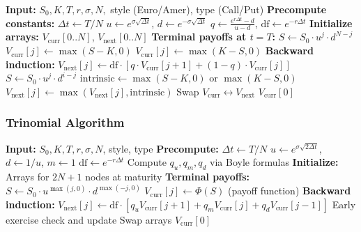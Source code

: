\documentclass[10pt,twocolumn]{article}
\begin{document}
\begin{algorithm}[H]
\caption{Optimized CRR Binomial Pricing}
\begin{algorithmic}[1]
\STATE \textbf{Input:} $S_0, K, T, r, \sigma, N, $ style (Euro/Amer), type (Call/Put)
\STATE \textbf{Precompute constants:}
\STATE \quad $\Delta t \gets T/N$
\STATE \quad $u \gets e^{\sigma\sqrt{\Delta t}}$, $d \gets e^{-\sigma\sqrt{\Delta t}}$
\STATE \quad $q \gets \frac{e^{r\Delta t} - d}{u - d}$, $\text{df} \gets e^{-r\Delta t}$
\STATE
\STATE \textbf{Initialize arrays:} $V_{\text{curr}}[0..N]$, $V_{\text{next}}[0..N]$
\STATE
\STATE \textbf{Terminal payoffs at $t = T$:}
    \STATE $S \gets S_0 \cdot u^j \cdot d^{N-j}$
        \STATE $V_{\text{curr}}[j] \gets \max(S - K, 0)$
    \ELSE
        \STATE $V_{\text{curr}}[j] \gets \max(K - S, 0)$
    \ENDIF
\ENDFOR
\STATE
\STATE \textbf{Backward induction:}
        \STATE $V_{\text{next}}[j] \gets \text{df} \cdot [q \cdot V_{\text{curr}}[j+1] + (1-q) \cdot V_{\text{curr}}[j]]$
            \STATE $S \gets S_0 \cdot u^j \cdot d^{i-j}$
            \STATE $\text{intrinsic} \gets \max(S - K, 0)$ or $\max(K - S, 0)$
            \STATE $V_{\text{next}}[j] \gets \max(V_{\text{next}}[j], \text{intrinsic})$
        \ENDIF
    \ENDFOR
    \STATE Swap $V_{\text{curr}} \leftrightarrow V_{\text{next}}$
\ENDFOR
\STATE
\RETURN $V_{\text{curr}}[0]$
\end{algorithmic}
\end{algorithm}

\subsubsection{Trinomial Algorithm}

\begin{algorithm}[H]
\caption{Optimized Boyle Trinomial Pricing}
\begin{algorithmic}[1]
\STATE \textbf{Input:} $S_0, K, T, r, \sigma, N$, style, type
\STATE \textbf{Precompute:}
\STATE \quad $\Delta t \gets T/N$
\STATE \quad $u \gets e^{\sigma\sqrt{2\Delta t}}$, $d \gets 1/u$, $m \gets 1$
\STATE \quad $\text{df} \gets e^{-r\Delta t}$
\STATE \quad Compute $q_u, q_m, q_d$ via Boyle formulas
\STATE
\STATE \textbf{Initialize:} Arrays for $2N+1$ nodes at maturity
\STATE
\STATE \textbf{Terminal payoffs:}
    \STATE $S \gets S_0 \cdot u^{\max(j,0)} \cdot d^{\max(-j,0)}$
    \STATE $V_{\text{curr}}[j] \gets \Phi(S)$ \quad (payoff function)
\ENDFOR
\STATE
\STATE \textbf{Backward induction:}
        \STATE $V_{\text{next}}[j] \gets \text{df} \cdot [q_u V_{\text{curr}}[j+1] + q_m V_{\text{curr}}[j] + q_d V_{\text{curr}}[j-1]]$
            \STATE Early exercise check and update
        \ENDIF
    \ENDFOR
    \STATE Swap arrays
\ENDFOR
\STATE
\RETURN $V_{\text{curr}}[0]$
\end{algorithmic}
\end{algorithm}
\end{document}
